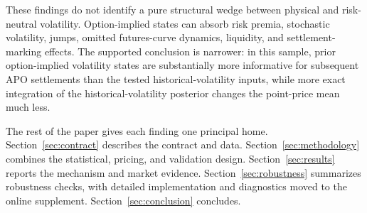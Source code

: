 These findings do not identify a pure structural wedge between physical and risk-neutral volatility. Option-implied states can absorb risk premia, stochastic volatility, jumps, omitted futures-curve dynamics, liquidity, and settlement-marking effects. The supported conclusion is narrower: in this sample, prior option-implied volatility states are substantially more informative for subsequent APO settlements than the tested historical-volatility inputs, while more exact integration of the historical-volatility posterior changes the point-price mean much less.

The rest of the paper gives each finding one principal home. Section~\ref{sec:contract} describes the contract and data. Section~\ref{sec:methodology} combines the statistical, pricing, and validation design. Section~\ref{sec:results} reports the mechanism and market evidence. Section~\ref{sec:robustness} summarizes robustness checks, with detailed implementation and diagnostics moved to the online supplement. Section~\ref{sec:conclusion} concludes.
